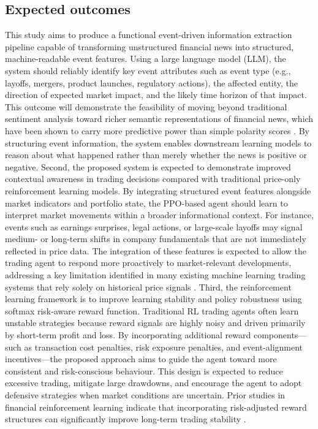 \documentclass[a4paper,fleqn]{cas-sc}
\begin{document}
\subsection{Expected outcomes}\label{sec:Research}
This study aims to produce a functional event-driven information extraction pipeline capable of transforming unstructured financial news into structured, machine-readable event features. Using a large language model (LLM), the system should reliably identify key event attributes such as event type (e.g., layoffs, mergers, product launches, regulatory actions), the affected entity, the direction of expected market impact, and the likely time horizon of that impact. This outcome will demonstrate the feasibility of moving beyond traditional sentiment analysis toward richer semantic representations of financial news, which have been shown to carry more predictive power than simple polarity scores \cite{yu2022assessing}. By structuring event information, the system enables downstream learning models to reason about what happened rather than merely whether the news is positive or negative. 
Second, the proposed system is expected to demonstrate improved contextual awareness in trading decisions compared with traditional price-only reinforcement learning models. By integrating structured event features alongside market indicators and portfolio state, the PPO-based agent should learn to interpret market movements within a broader informational context. For instance, events such as earnings surprises, legal actions, or large-scale layoffs may signal medium- or long-term shifts in company fundamentals that are not immediately reflected in price data. The integration of these features is expected to allow the trading agent to respond more proactively to market-relevant developments, addressing a key limitation identified in many existing machine learning trading systems that rely solely on historical price signals \cite{yu2022assessing}. 
Third, the reinforcement learning framework is to improve learning stability and policy robustness using softmax risk-aware reward function. Traditional RL trading agents often learn unstable strategies because reward signals are highly noisy and driven primarily by short-term profit and loss. By incorporating additional reward components—such as transaction cost penalties, risk exposure penalties, and event-alignment incentives—the proposed approach aims to guide the agent toward more consistent and risk-conscious behaviour. This design is expected to reduce excessive trading, mitigate large drawdowns, and encourage the agent to adopt defensive strategies when market conditions are uncertain. Prior studies in financial reinforcement learning indicate that incorporating risk-adjusted reward structures can significantly improve long-term trading stability \cite{eight}. 
\end{document}
